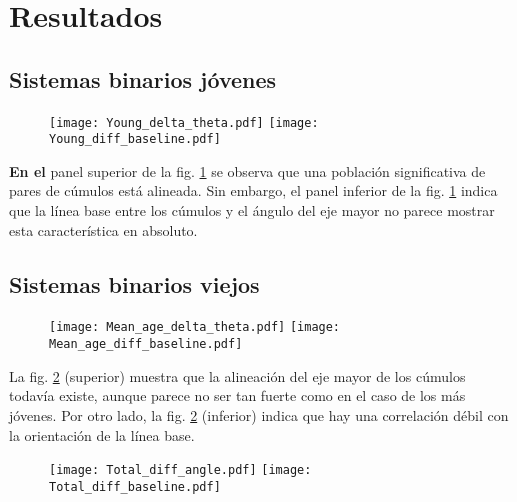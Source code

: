 \documentclass[baaa]{baaa}
\begin{document}
\section{Resultados}
    

\subsection{Sistemas binarios jóvenes}


\begin{figure}[]
\centering
\texttt{[image: Young\_delta\_theta.pdf]}
\texttt{[image: Young\_diff\_baseline.pdf]}
\label{fig:young}
\end{figure}

\noindent  \textbf{En el} panel superior de la fig. \ref{fig:young} se observa que una población significativa de pares de cúmulos está alineada. Sin embargo, el panel inferior de la fig. \ref{fig:young} indica que la línea base entre los cúmulos y el ángulo del eje mayor no parece mostrar esta característica en absoluto.


\subsection{Sistemas binarios viejos}


\begin{figure}[]
\centering
\texttt{[image: Mean\_age\_delta\_theta.pdf]}
\texttt{[image: Mean\_age\_diff\_baseline.pdf]}
\label{fig:middle}
\end{figure}

\noindent  La fig. \ref{fig:middle} (superior) muestra que la alineación del eje mayor de los cúmulos todavía existe, aunque parece no ser tan fuerte como en el caso de los más jóvenes. Por otro lado, la fig. \ref{fig:middle} (inferior) indica que hay una correlación débil con la orientación de la línea base.

\begin{figure}[]
\centering

\texttt{[image: Total\_diff\_angle.pdf]}
\texttt{[image: Total\_diff\_baseline.pdf]}
\label{fig:all}
\end{figure}
\end{document}
